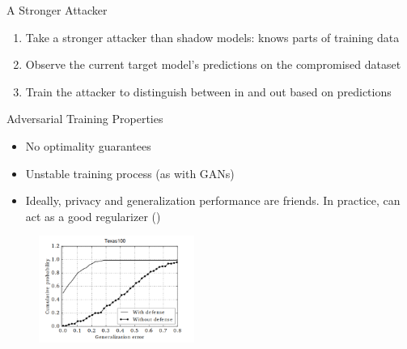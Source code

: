 \documentclass[10pt]{beamer}
\begin{document}
\begin{frame}{A Stronger Attacker}
  \begin{figure}
    \centering
    
  \end{figure}
  \begin{enumerate}[<+-| alert@+>]
    \item Take a stronger attacker than shadow models: knows parts of training data
    \item Observe the current target model's predictions on the compromised dataset
    \item Train the attacker to distinguish between in and out based on predictions
  \end{enumerate}
\end{frame}

\begin{frame}{Adversarial Training Properties}
  \begin{itemize}[<+-| alert@+>]
    \item No optimality guarantees
    \item Unstable training process (as with GANs)
    \item Ideally, privacy and generalization performance are friends. In practice, can act as a
      good regularizer (\cite{NasrSH18})
  \end{itemize}

  \begin{figure}
    \includegraphics[width=2in]{regularization.png}
  \end{figure}
\end{frame}
\end{document}

